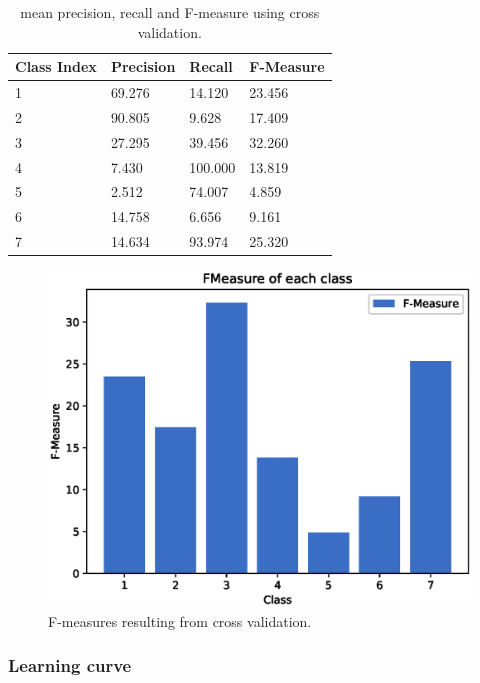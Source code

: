 \documentclass[a4paper, 10pt]{article}
\begin{document}
\begin{table}[H]
\centering
\begin{tabular}{|l|l|l|l|}
\hline
\textbf{Class Index} & \textbf{Precision} & \textbf{Recall} & \textbf{F-Measure}\\\hline
1 & 69.276 & 14.120& 23.456\\\hline
2 & 90.805 & 9.628& 17.409\\\hline
3 & 27.295 & 39.456& 32.260\\\hline
4 & 7.430 & 100.000& 13.819\\\hline
5 & 2.512 & 74.007& 4.859\\\hline
6 & 14.758 & 6.656& 9.161\\\hline
7 & 14.634 & 93.974& 25.320\\\hline
\end{tabular}
\caption{mean precision, recall and F-measure using cross validation.}
\label{tab:gnb_pr}
\end{table}

\begin{figure}[H]
 \centering
 \includegraphics[width=0.8\linewidth]{pictures/nb_gaussian_fmeasure.eps}
 \caption{F-measures resulting from cross validation.}
 \label{fig:gnb_fmeasure}
\end{figure}


\subsubsection{Learning curve}
\end{document}
